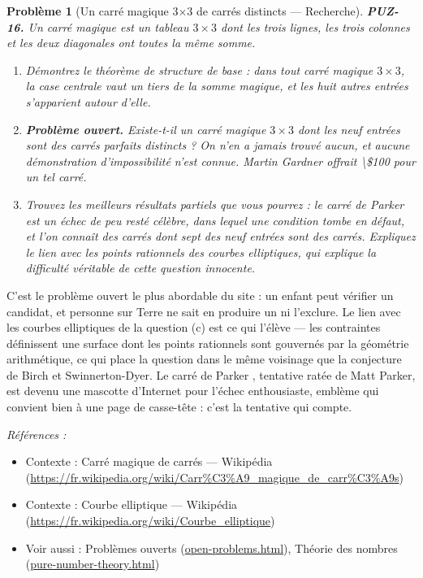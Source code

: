 \documentclass[11pt]{article}
\newtheorem{problem}{Problème}
\newenvironment{refs}{\par\small\noindent\emph{Références :}\begin{itemize}\setlength\itemsep{0pt}}{\end{itemize}\normalsize}
\begin{document}
\begin{problem}[{Un carré magique 3$\times$3 de carrés distincts --- Recherche}]
\textbf{PUZ-16.} Un carré magique est un tableau $ 3 \times 3 $ dont les trois lignes,
les trois colonnes et les deux diagonales ont toutes la même somme.
\begin{enumerate}
\item[(a)] Démontrez le théorème de structure de base : dans tout carré magique $ 3 \times 3 $, la
case centrale vaut un tiers de la somme magique, et les huit autres entrées s'apparient
autour d'elle.
\item[(b)] \textbf{Problème ouvert.} Existe-t-il un carré magique $ 3 \times 3 $ dont les neuf
entrées sont des carrés parfaits distincts ? On n'en a jamais trouvé aucun, et aucune
démonstration d'impossibilité n'est connue. Martin Gardner offrait \textbackslash{}\$100 pour un tel
carré.
\item[(c)] Trouvez les meilleurs résultats partiels que vous pourrez : le \og{} carré de Parker \fg{} est un
échec de peu resté célèbre, dans lequel une condition tombe en défaut, et l'on connaît des
carrés dont sept des neuf entrées sont des carrés. Expliquez le lien avec les points
rationnels des courbes elliptiques, qui explique la difficulté véritable de cette question
innocente.
\end{enumerate}

\end{problem}

\noindent C'est le problème ouvert le plus abordable du site : un enfant peut
vérifier un candidat, et personne sur Terre ne sait en produire un ni l'exclure. Le lien avec
les courbes elliptiques de la question (c) est ce qui l'élève --- les contraintes définissent
une surface dont les points rationnels sont gouvernés par la géométrie arithmétique, ce qui
place la question dans le même voisinage que la conjecture de Birch et Swinnerton-Dyer. Le
\og{} carré de Parker \fg{}, tentative ratée de Matt Parker, est devenu une mascotte d'Internet pour
l'échec enthousiaste, emblème qui convient bien à une page de casse-tête : c'est la tentative
qui compte.

\begin{refs}
\item Contexte : Carré magique de carrés --- Wikipédia (\url{https://fr.wikipedia.org/wiki/Carr%C3%A9_magique_de_carr%C3%A9s})
\item Contexte : Courbe elliptique --- Wikipédia (\url{https://fr.wikipedia.org/wiki/Courbe_elliptique})
\item Voir aussi : Problèmes ouverts (\url{open-problems.html}), Théorie des nombres (\url{pure-number-theory.html})
\end{refs}
\end{document}
